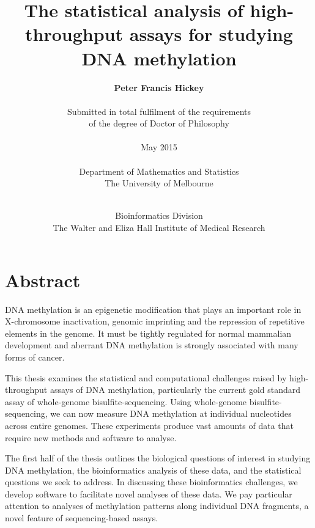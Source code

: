 \documentclass[11pt,a4paper,oneside]{book}	%
\newcommand\blankpage{%
    \null
    \thispagestyle{empty}%
    \addtocounter{page}{-1}%
    \newpage}
\begin{document}


\title{\huge \bf The statistical analysis of high-throughput assays
for studying DNA methylation\\}

\author{{\bf \Large Peter Francis Hickey}\\\\
Submitted in total fulfilment of the requirements\\
of the degree of Doctor of Philosophy\\\\
May 2015\\\\
Department of Mathematics and Statistics\\
The University of Melbourne\\\\}

\date{Bioinformatics Division\\
The Walter and Eliza Hall Institute of Medical Research}

\frontmatter

\maketitle

\blankpage

\chapter{Abstract}

DNA methylation is an epigenetic modification that plays an important role in X-chromosome inactivation, genomic imprinting and the repression of repetitive elements in the genome. It must be tightly regulated for normal mammalian development and aberrant DNA methylation is strongly associated with many forms of cancer.

This thesis examines the statistical and computational challenges raised by high-throughput assays of DNA methylation, particularly the current gold standard assay of whole-genome bisulfite-sequencing. Using whole-genome bisulfite-sequencing, we can now measure DNA methylation at individual nucleotides across entire genomes. These experiments produce vast amounts of data that require new methods and software to analyse.

The first half of the thesis outlines the biological questions of interest in studying DNA methylation, the bioinformatics analysis of these data, and the statistical questions we seek to address. In discussing these bioinformatics challenges, we develop software to facilitate novel analyses of these data. We pay particular attention to analyses of methylation patterns along individual DNA fragments, a novel feature of sequencing-based assays.
\end{document}

